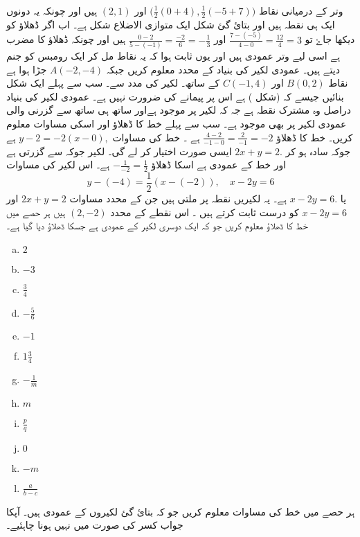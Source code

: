 وتر کے درمیانی نقاط \( \big( \frac{1}{2} (0+4), \frac{1}{2} (-5+7) \big) \) اور \( (2,1) \) ہیں اور چونکہ یہ دونوں ایک ہی نقطہ ہیں اور بتائ گئ شکل ایک متوازی الاضلاع شکل ہے۔
اب اگر ڈھلاؤ کو دیکھا جاۓ تو \( \frac{7-(-5)}{4-0} = \frac{12}{4} = 3 \)  اور \( \frac{0-2}{5-(-1)} = \frac{-2}{6}= - \frac{1}{3} \) ہیں اور چونکہ ڈھلاؤ کا مضرب  ہے اسی لیے وتر عمودی ہیں اور یوں ثابت ہوا کہ یہ نقاط مل کر ایک رومبس کو جنم دیتے ہیں۔ 
عمودی لکیر کی بنیاد کے محدد معلوم کریں جبکہ \( A(-2,-4)\)  جڑا ہوا  ہے نقاط \(B(0,2) \)  اور \( C(-1,4) \) کے ساتھ۔ لکیر کی مدد سے۔
سب سے پہلے ایک شکل بنائیں جیسے کہ (شکل  ) ہے اس پر پیمانے کی ضرورت نہیں ہے۔ عمودی لکیر کی بنیاد دراصل وہ مشترک نقطہ  ہے جہ کہ لکیر پر موجود ہےاور ساتھ ہی ساتھ  سے گزرنی والی عمودی لکیر  پر بھی موجود ہے۔ سب سے پہلے خط  کا ڈھلاؤ اور اسکی مساوات معلوم کریں۔
 خط  کا ڈھلاؤ  \(\frac{4-2}{-1-0} = \frac{2}{-1} =-2 \) ہے ۔ خط  کی مساوات  \(y-2=-2(x-0), \) ہے جوکہ سادہ ہو کر \( 2x+y=2. \) ایسی صورت اختیار کر لے گی۔
لکیر جوکہ  سے گزرتی ہے اور خط  کے عمودی ہے اسکا ڈھلاؤ   \( - \frac{1}{-2} = \frac{1}{2} \) ہے۔ 
اس لکیر کی مساوات 
\[ y-(-4)= \frac{1}{2} (x-(-2)), \quad x-2y=6 \]
یا \( x-2y=6. \) ہے۔
یہ لکیریں نقطہ پر ملتی ہیں جن کے محدد مساوات \(2x+y=2 \)  اور \( x-2y=6\) کو درست ثابت کرتے ہیں ۔ اس نقطے کے محدد \( (2,-2) \) ہیں
ہر حصے میں خط کا ڈھلاؤ معلوم کریں جو کہ ایک دوسری لکیر کے عمودی ہے جسکا ڈھلاؤ دیا گیا ہے۔
\begin{multicols}{6}
\begin{enumerate}[a.]
\item \(2\)
\item \(-3\)
\item \(\frac{3}{4} \)
\item \(-\frac{5}{6} \)
\item \(-1 \)
\item \(1\frac{3}{4} \)
\item \(-\frac{1}{m} \)
\item \(m \)
\item \(\frac{p}{q} \)
\item \(0 \)
\item \(-m \)
\item \(\frac{a}{b-c} \)
\end{enumerate}
\end{multicols}
ہر حصے میں خط کی مساوات معلوم کریں جو کہ بتائ گئ لکیروں کے عمودی ہیں۔ آپکا جواب کسر کی صورت میں نہیں ہونا چاہئیے۔
